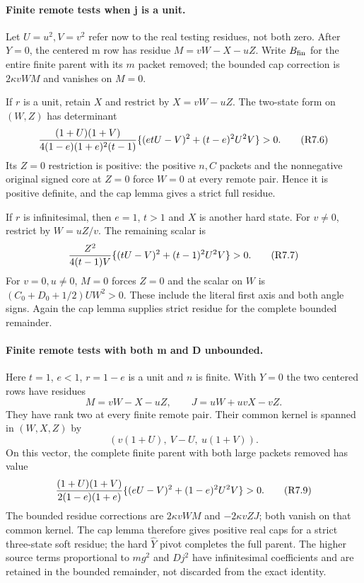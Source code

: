 \paragraph{Finite remote tests when j is a unit.}
Let $U=u^2,V=v^2$ refer now to the real testing residues, not both zero.
After $Y=0$, the centered m row has residue
$M=vW-X-uZ$. Write $B_{\rm fin}$ for the entire finite parent with its
$m$ packet removed; the bounded cap correction is $2\kappa vWM$ and
vanishes on $M=0$.

If $r$ is a unit, retain $X$ and restrict by $X=vW-uZ$. The two-state
form on $(W,Z)$ has determinant
\[
 { (1+U)(1+V)\over4(1-e)(1+e)^2(t-1)}
       \{(etU-V)^2+(t-e)^2U^2V\}>0.                 \tag{R7.6}
\]
Its $Z=0$ restriction is positive: the positive $n,C$ packets and the
nonnegative original signed core at $Z=0$ force $W=0$ at every remote
pair. Hence it is positive definite, and the cap lemma gives a strict
full residue.

If $r$ is infinitesimal, then $e=1$, $t>1$ and $X$ is another hard state.
For $v\ne0$, restrict by $W=uZ/v$. The remaining scalar is
\[
 {Z^2\over4(t-1)V}\{(tU-V)^2+(t-1)^2U^2V\}>0.      \tag{R7.7}
\]
For $v=0,u\ne0$, $M=0$ forces $Z=0$ and the scalar on $W$ is
$(C_0+D_0+1/2)UW^2>0$. These include the literal first axis and both
angle signs. Again the cap lemma supplies strict residue for the complete
bounded remainder.

\paragraph{Finite remote tests with both m and D unbounded.}
Here $t=1$, $e<1$, $r=1-e$ is a unit and $n$ is finite. With $Y=0$ the
two centered rows have residues
\[
 M=vW-X-uZ,\qquad J=uW+uvX-vZ.
\]
They have rank two at every finite remote pair. Their common kernel is
spanned in $(W,X,Z)$ by
\[
 (v(1+U),\ V-U,\ u(1+V)).                            \tag{R7.8}
\]
On this vector, the complete finite parent with both large packets
removed has value
\[
 { (1+U)(1+V)\over2(1-e)(1+e)}
       \{(eU-V)^2+(1-e)^2U^2V\}>0.                  \tag{R7.9}
\]
The bounded residue corrections are $2\kappa vWM$ and
$-2\kappa vZJ$; both vanish on that common kernel. The cap lemma therefore
gives positive real caps for a strict three-state soft residue; the hard
$\widehat Y$ pivot completes the full parent. The higher source terms
proportional to $mg^2$ and $Dj^2$ have infinitesimal coefficients and are
retained in the bounded remainder, not discarded from the exact identity.

